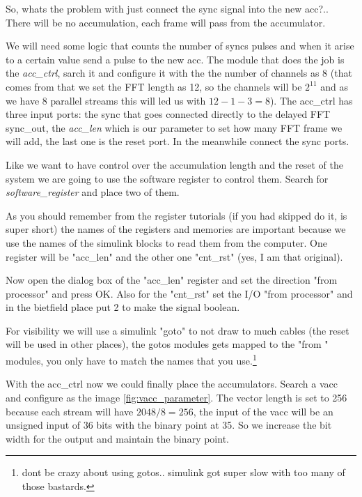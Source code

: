 So, whats the problem with just connect the sync signal into the new acc?.. 
\vspace{0.1cm}
There will be no accumulation, each frame will pass from the accumulator.

We will need some logic that counts the number of syncs pulses and when it arise to a certain value send a pulse to the new acc. The module that does the job is the \textit{acc\_ctrl}, sarch it and configure it with the the number of channels as 8 (that comes from that we set the FFT length as 12, so the channels will be $2^11$ and as we have 8 parallel streams this will led us with $12-1-3=8$).
The acc\_ctrl has three input ports: the sync that goes connected directly to the delayed FFT sync\_out, the \textit{acc\_len} which is our parameter to set how many FFT frame we will add, the last one is the reset port. In the meanwhile connect the sync ports.


Like we want to have control over the accumulation length and the reset of the system we are going to use the software register to control them. 
Search for \textit{software\_register} and place two of them.


As you should remember from the register tutorials (if you had skipped do it, is super short) the names of the registers and memories are important because we use the names of the simulink blocks to read them from the computer. 
One register will be "acc\_len" and the other one "cnt\_rst" (yes, I am that original).

Now open the dialog box of the "acc\_len" register and set the direction "from processor" and press OK. Also for the "cnt\_rst" set the I/O "from processor" and in the bietfield place put 2 to make the signal boolean.


For visibility we will use a simulink "goto" to not draw to much cables (the reset will be used in other places), the gotos modules gets mapped to the "from " modules, you only have to match the names that you use.\footnote{dont be crazy about using gotos.. simulink got super slow with too many of those bastards.}


With the acc\_ctrl now we could finally place the accumulators. Search a vacc and configure as the image \ref{fig:vacc_parameter}. The vector length is set to 256 because each stream will have $2048/8=256$, the input of the vacc will be an unsigned input of 36 bits with the binary point at 35. So we increase the bit width for the output and maintain the binary point.

